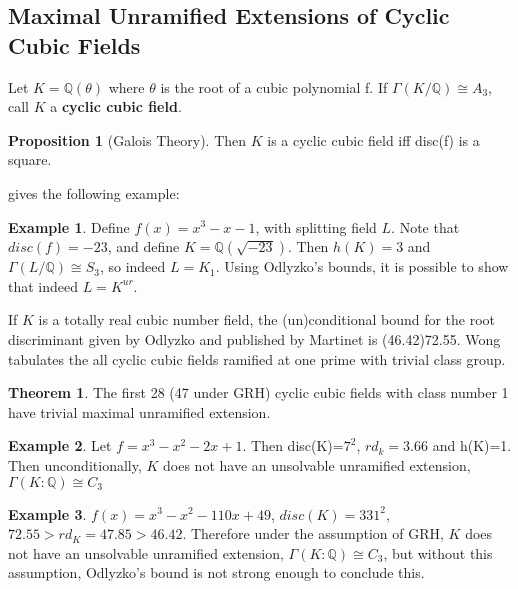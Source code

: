 \documentclass[12pt]{extarticle}
\newcommand{\Q}{\mathbb{Q}}
\newcommand{\<}{\langle}
\renewcommand{\>}{\rangle}
\theoremstyle{definition}
\newtheorem{theorem}{Theorem}
\newtheorem{proposition}{Proposition}
\newtheorem*{example}{Example}
\begin{document}
\subsection{Maximal Unramified Extensions of Cyclic Cubic Fields}
Let $K=\Q(\theta)$ where $\theta$ is the root of a cubic polynomial 
f. If $\Gamma(K/\Q) \cong A_3$, call $K$ a  \textbf{cyclic cubic field}.
\begin{proposition}[Galois Theory]
Then $K$ is a cyclic cubic field iff disc(f) is a square. 

\cite{SERR} gives the following example:
\begin{example}
Define $f(x) = x^3-x-1$, with splitting field $L$. Note that $disc(f)=-23$, and define $K=\Q(\sqrt{-23})$. Then $h(K)=3$ and $\Gamma(L/\Q) \cong S_3$, so indeed $L=K_1$. Using Odlyzko's bounds, it is possible to show that indeed $L = K^{ur}$.
\end{example}

\end{proposition} If $K$ is a totally real cubic number field, the (un)conditional bound for the root discriminant given by Odlyzko and published by Martinet is (46.42)72.55. Wong tabulates the all cyclic cubic fields ramified at one prime with trivial class group. 
\begin{theorem}
The first 28 (47 under GRH) cyclic cubic fields with class number 1 have trivial maximal unramified extension.
\end{theorem}
\begin{example}
    Let $f=x^3-x^2-2x+1$. Then disc(K)=$7^2$, $rd_{k}=3.66$ and h(K)=1. Then unconditionally, $K$ does not have an unsolvable unramified extension, $\Gamma(K:\mathbb{Q})\cong C_3$
\end{example}
\begin{example}
    $f(x)=x^3 -x^2 -110x +49$, $disc(K)=331^2$, $72.55 > rd_{K}=47.85 > 46.42$. Therefore under the assumption of GRH, $K$ does not have an unsolvable unramified extension, $\Gamma(K:\mathbb{Q})\cong C_3$, but without this assumption, Odlyzko's bound is not strong enough to conclude this.
\end{example}
\end{document}
